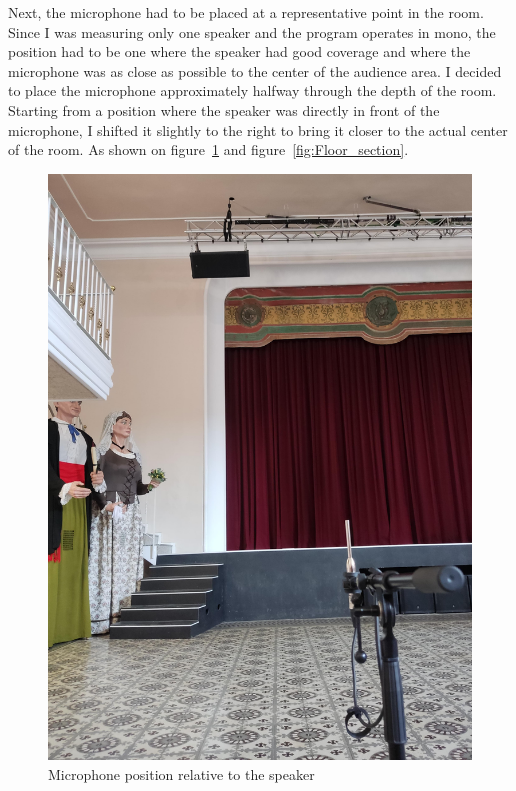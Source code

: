Next, the microphone had to be placed at a representative point in the room. Since I was measuring only one speaker and the program operates in mono, the position had to be one where the speaker had good coverage and where the microphone was as close as possible to the center of the audience area. I decided to place the microphone approximately halfway through the depth of the room. Starting from a position where the speaker was directly in front of the microphone, I shifted it slightly to the right to bring it closer to the actual center of the room. As shown on figure~\ref{fig:Mic_pos3} and figure~\ref{fig:Floor_section}.
\begin{figure}[H]
	\centering
	\includegraphics[width=0.8
	\linewidth]{Figures/Coro_micpos3.jpeg}
	\caption{Microphone position relative to the speaker}
	\label{fig:Mic_pos3}
\end{figure}

